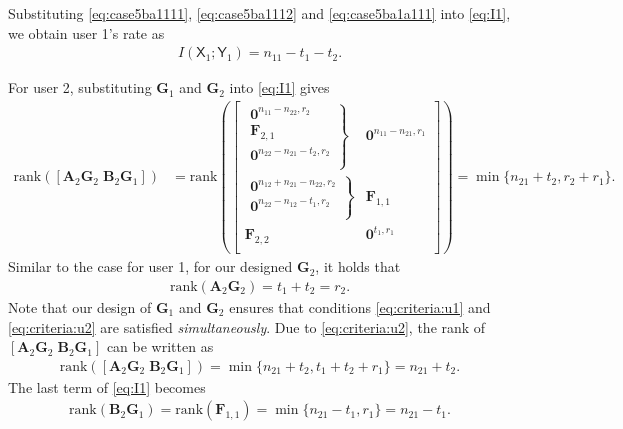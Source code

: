 \documentclass[12pt, draftclsnofoot, onecolumn]{IEEEtran}
\newcommand{\msf}[1]{\mathsf{#1}}
\theoremstyle{definition}
\begin{document}
Substituting \eqref{eq:case5ba1111}, \eqref{eq:case5ba1112} and \eqref{eq:case5ba1a111} into \eqref{eq:I1}, we obtain user 1's rate as
\begin{align}
I(\msf{X}_1;\msf{Y}_1) = n_{11}-t_1-t_2.
\end{align}


For user 2, substituting $\boldsymbol{G}_1$ and $\boldsymbol{G}_2$ into \eqref{eq:I1} gives
\begin{align}
\text{rank}([\boldsymbol{A}_2\boldsymbol{G}_2 \; \boldsymbol{B}_2\boldsymbol{G}_1]) &=\text{rank}\left(\begin{bmatrix}
\left. {\begin{array}{*{20}{c}}
\boldsymbol{0}^{n_{11}-n_{22},r_2} \\
\boldsymbol{F}_{2,1}  \\
\boldsymbol{0}^{n_{22}-n_{21}-t_2,r_2} \\
\end{array}} \right\} & \boldsymbol{0}^{n_{11}-n_{21},r_1}\\
\left. {\begin{array}{*{20}{c}}
\boldsymbol{0}^{n_{12}+n_{21}-n_{22},r_2}\\
\boldsymbol{0}^{n_{22}-n_{12}-t_1,r_2}\\
\end{array}} \right\} & \boldsymbol{F}_{1,1}\\
\boldsymbol{F}_{2,2} & \boldsymbol{0}^{t_1,r_1}\\
\end{bmatrix}
\right) %
= \min\{n_{21}+t_2,r_2+r_1\}.
\end{align}
Similar to the case for user 1, for our designed $\boldsymbol{G}_2$, it holds that
\begin{align}\label{eq:criteria:u2}
\text{rank}(\boldsymbol{A}_2\boldsymbol{G}_2) =  t_1+t_2= r_2.
\end{align}
Note that our design of $\boldsymbol{G}_1$ and $\boldsymbol{G}_2$ ensures that conditions \eqref{eq:criteria:u1} and \eqref{eq:criteria:u2} are satisfied \emph{simultaneously}. Due to \eqref{eq:criteria:u2}, the rank of $[\boldsymbol{A}_2\boldsymbol{G}_2 \; \boldsymbol{B}_2\boldsymbol{G}_1]$ can be written as
\begin{align}
\text{rank}([\boldsymbol{A}_2\boldsymbol{G}_2 \; \boldsymbol{B}_2\boldsymbol{G}_1]) = \min\{n_{21}+t_2,t_1+t_2+r_1\} = n_{21}+t_2.
\end{align}
The last term of \eqref{eq:I1} becomes
\begin{align}
\text{rank}(\boldsymbol{B}_2\boldsymbol{G}_1) = \text{rank}(\boldsymbol{F}_{1,1}) = \min\{n_{21}-t_1,r_1\} = n_{21}-t_1.
\end{align}
\end{document}
